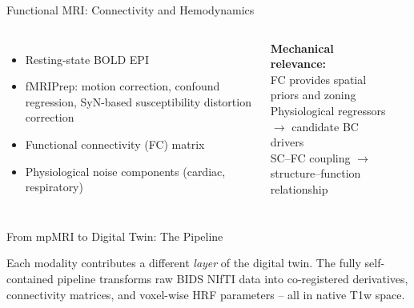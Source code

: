 \begin{frame}{Functional MRI: Connectivity and Hemodynamics}

  \begin{columns}[T]
    \begin{itemize}
      \item Resting-state BOLD EPI
      \item fMRIPrep: motion correction, confound regression,
        SyN-based susceptibility distortion correction
      \item Functional connectivity (FC) matrix
      \item Physiological noise components (cardiac, respiratory)
    \end{itemize}

    \bigskip

    \textbf{Mechanical relevance:}\\
    FC provides spatial priors and zoning\\
    Physiological regressors $\to$ candidate BC drivers\\
    SC--FC coupling $\to$ structure--function relationship

    \begin{center}
    \end{center}
  \end{columns}

\end{frame}

\begin{frame}{From mpMRI to Digital Twin: The Pipeline}

  \begin{center}
  \end{center}

  \bigskip

  Each modality contributes a different \emph{layer} of the digital
  twin. The fully self-contained pipeline transforms raw BIDS NIfTI
  data into co-registered derivatives, connectivity matrices, and
  voxel-wise HRF parameters -- all in native T1w space.

\end{frame}
